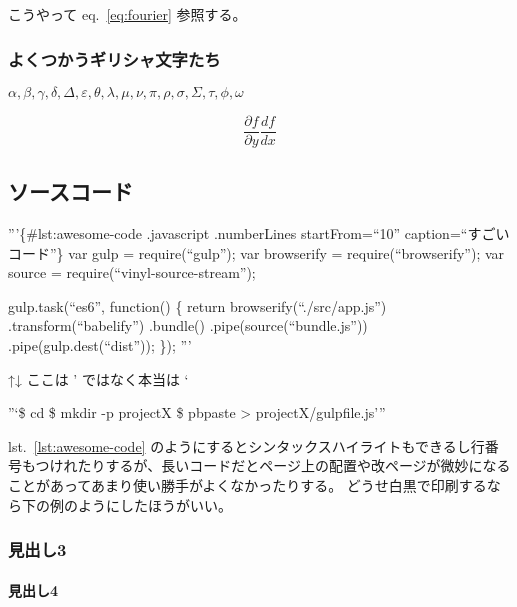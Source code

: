 こうやって eq.~\ref{eq:fourier} 参照する。

\hypertarget{ux3088ux304fux3064ux304bux3046ux30aeux30eaux30b7ux30e3ux6587ux5b57ux305fux3061}{%
\subsubsection{よくつかうギリシャ文字たち}\label{ux3088ux304fux3064ux304bux3046ux30aeux30eaux30b7ux30e3ux6587ux5b57ux305fux3061}}

\(\alpha, \beta, \gamma, \delta, \Delta, \varepsilon, \theta, \lambda, \mu, \nu, \pi, \rho, \sigma, \Sigma, \tau, \phi, \omega\)

\[\frac{\partial f}{\partial y} \frac{d f}{d x}\]

\hypertarget{ux30bdux30fcux30b9ux30b3ux30fcux30c9}{%
\subsection{ソースコード}\label{ux30bdux30fcux30b9ux30b3ux30fcux30c9}}

'''\{\#lst:awesome-code .javascript .numberLines startFrom=``10''
caption=``すごいコード''\} var gulp = require(``gulp''); var browserify
= require(``browserify''); var source =
require(``vinyl-source-stream'');

gulp.task(``es6'', function() \{ return browserify(``./src/app.js'')
.transform(``babelify'') .bundle() .pipe(source(``bundle.js''))
.pipe(gulp.dest(``dist'')); \}); '''

↑↓ ここは ' ではなく本当は `

''`\$ cd \$ mkdir -p projectX \$ pbpaste \textgreater{}
projectX/gulpfile.js'''

lst.~\ref{lst:awesome-code}
のようにするとシンタックスハイライトもできるし行番号もつけれたりするが、長いコードだとページ上の配置や改ページが微妙になることがあってあまり使い勝手がよくなかったりする。
どうせ白黒で印刷するなら下の例のようにしたほうがいい。

\hypertarget{ux898bux51faux30573}{%
\subsubsection{見出し3}\label{ux898bux51faux30573}}

\hypertarget{ux898bux51faux30574}{%
\paragraph{見出し4}\label{ux898bux51faux30574}}

